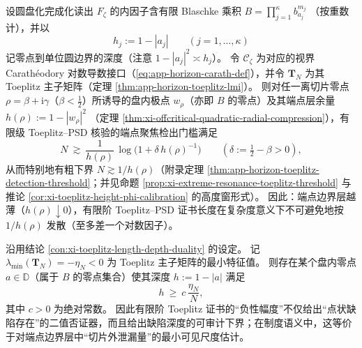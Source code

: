 \begin{proposition}\label{con:xi-toeplitz-length-depth-duality}
设圆盘化完成化读出 \(F_{\zeta}\) 的内因子含有限 Blaschke 乘积
\(
B=\prod_{j=1}^{\kappa}b_{a_j}^{m_j}
\)
（按重数计），并以
\[
h_j:=1-|a_j|
\qquad(j=1,\dots,\kappa)
\]
记零点到单位圆边界的深度（注意 \(1-|a_j|^2\asymp h_j\)）。
令 \(\mathscr{C}_{\zeta}\) 为对应的视界 Carath\'eodory 对数导数接口（\eqref{eq:app-horizon-carath-def}），并令 \(\mathbf{T}_N\) 为其 Toeplitz 主子矩阵（定理 \ref{thm:app-horizon-toeplitz-lmi}）。
则对任一离切片零点 \(\rho=\beta+\mathrm{i}\gamma\)（\(\beta<\tfrac12\)）所诱导的盘内极点 \(w_\rho\)（亦即 \(B\) 的零点）及其端点层余量
\(
h(\rho):=1-|w_\rho|^2
\)
（定理 \ref{thm:xi-offcritical-quadratic-radial-compression}），有限级 Toeplitz--PSD 核验的端点聚焦检出门槛满足
\[
N\ \gtrsim\ \frac{1}{h(\rho)}\,\log\!\bigl(1+\delta\,h(\rho)^{-1}\bigr)
\qquad(\delta:=\tfrac12-\beta>0),
\]
从而特别地有粗下界 \(N\gtrsim 1/h(\rho)\)（附录定理 \ref{thm:app-horizon-toeplitz-detection-threshold}；并见命题 \ref{prop:xi-extreme-resonance-toeplitz-threshold} 与推论 \ref{cor:xi-toeplitz-height-phi-calibration} 的高度窗形式）。
因此：端点边界层越薄（\(h(\rho)\downarrow 0\)），有限阶 Toeplitz--PSD 证书长度在复杂度意义下不可避免地按 \(1/h(\rho)\) 发散（至多差一个对数因子）。
\end{proposition}

\begin{proposition}\label{con:xi-toeplitz-negative-eigenvalue-controls-depth}
沿用结论 \ref{con:xi-toeplitz-length-depth-duality} 的设定。
记 \(\lambda_{\min}(\mathbf{T}_N)=-\eta_N<0\) 为 Toeplitz 主子矩阵的最小特征值。
则存在某个盘内零点 \(a\in\mathbb{D}\)（属于 \(B\) 的零点集合）使其深度 \(h:=1-|a|\) 满足
\[
h\ \ge\ c\,\frac{\eta_N}{N},
\]
其中 \(c>0\) 为绝对常数。
因此有限阶 Toeplitz 证书的“负性幅度”不仅给出“点状缺陷存在”的二值否证器，而且给出缺陷深度的可审计下界；在制度语义中，这等价于对端点边界层中“切片外泄漏量”的最小可见尺度估计。
\end{proposition}




